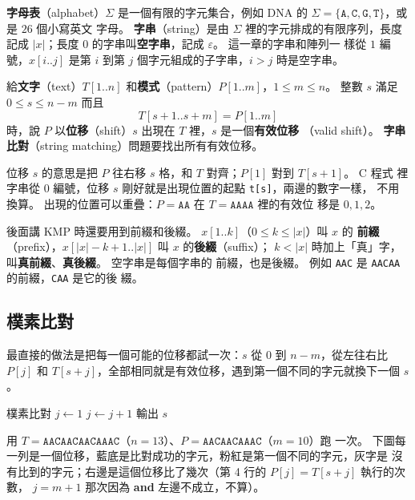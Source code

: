 \textbf{字母表}（alphabet）$\Sigma$ 是一個有限的字元集合，例如 DNA 的
$\Sigma = \{\mathtt{A}, \mathtt{C}, \mathtt{G}, \mathtt{T}\}$，或是 $26$ 個小寫英文
字母。 \textbf{字串}（string）是由 $\Sigma$ 裡的字元排成的有限序列，長度記成
$|x|$；長度 $0$ 的字串叫\textbf{空字串}，記成 $\varepsilon$。 這一章的字串和陣列一
樣從 $1$ 編號，$x[i..j]$ 是第 $i$ 到第 $j$ 個字元組成的子字串，$i > j$ 時是空字串。

\begin{definition}
\label{def:stm-problem}
給\textbf{文字}（text）$T[1..n]$ 和\textbf{模式}（pattern）$P[1..m]$，$1 \le m \le
n$。 整數 $s$ 滿足 $0 \le s \le n - m$ 而且
\[
T[s + 1 .. s + m] = P[1..m]
\]
時，說 $P$ 以\textbf{位移}（shift）$s$ 出現在 $T$ 裡，$s$ 是一個\textbf{有效位移}
（valid shift）。 \textbf{字串比對}（string matching）問題要找出所有有效位移。
\end{definition}

位移 $s$ 的意思是把 $P$ 往右移 $s$ 格，和 $T$ 對齊；$P[1]$ 對到 $T[s + 1]$。 C 程式
裡字串從 $0$ 編號，位移 $s$ 剛好就是出現位置的起點 \texttt{t[s]}，兩邊的數字一樣，
不用換算。 出現的位置可以重疊：$P = \mathtt{AA}$ 在 $T = \mathtt{AAAA}$ 裡的有效位
移是 $0, 1, 2$。

後面講 KMP 時還要用到前綴和後綴。 $x[1..k]$（$0 \le k \le |x|$）叫 $x$ 的
\textbf{前綴}（prefix），$x[|x| - k + 1 .. |x|]$ 叫 $x$ 的\textbf{後綴}（suffix）；
$k < |x|$ 時加上「真」字，叫\textbf{真前綴}、\textbf{真後綴}。 空字串是每個字串的
前綴，也是後綴。 例如 \texttt{AAC} 是 \texttt{AACAA} 的前綴，\texttt{CAA} 是它的後
綴。

\subsection{樸素比對}

最直接的做法是把每一個可能的位移都試一次：$s$ 從 $0$ 到 $n - m$，從左往右比
$P[j]$ 和 $T[s + j]$，全部相同就是有效位移，遇到第一個不同的字元就換下一個 $s$。

\begin{pseudo}[label=alg:stm-naive]{樸素比對}
        \State $j \gets 1$
            \State $j \gets j + 1$
        \EndWhile
            \State 輸出 $s$ 
        \EndIf
    \EndFor
\EndProcedure
\end{pseudo}

用 $T = \mathtt{AACAACAACAAAC}$（$n = 13$）、$P = \mathtt{AACAACAAAC}$（$m = 10$）跑
一次。 下圖每一列是一個位移，藍底是比對成功的字元，粉紅是第一個不同的字元，灰字是
沒有比到的字元；右邊是這個位移比了幾次（第 4 行的 $P[j] = T[s + j]$ 執行的次數，
$j = m + 1$ 那次因為 \textbf{and} 左邊不成立，不算）。

